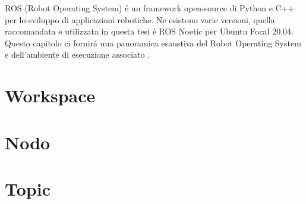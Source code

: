 ROS (Robot Operating System) \'{e} un framework open-source di Python e C++ per lo sviluppo di applicazioni robotiche.
Ne esistono varie versioni, quella raccomandata e utilizzata in questa tesi \'{e} ROS Noetic per Ubuntu Focal 20.04.
Questo capitolo ci fornir\'{a} una panoramica esaustiva del Robot Operating System e dell'ambiente di esecuzione associato 
\cite{ros}.

\section{Workspace}


\section{Nodo}


\section{Topic}
